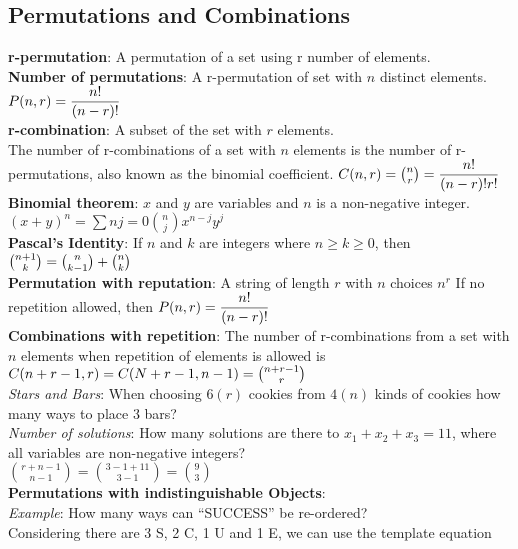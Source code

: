 \documentclass[letter]{article}
\begin{document}
\begin{multicols}{2}
  \subsection{Permutations and Combinations} 
  \textbf{r-permutation}: A permutation of a set using r number of
  elements. \\
  \textbf{Number of permutations}: A r-permutation of set with $n$ distinct
  elements.
  $\\P(n, r) = \dfrac{n!}{(n - r)!}$\\
  \textbf{r-combination}: A subset of the set with $r$ elements. \\
  The number of r-combinations of a set with $n$ elements is the number of
  r-permutations, also known as the binomial coefficient.
  $\\C(n, r) = \binom{n}{r} = \dfrac{n!}{(n - r)!r!}$\\
  \textbf{Binomial theorem}: $x$ and $y$ are variables and $n$ is a
  non-negative integer. \\
  ${(x + y)}^{n} = \sum{n}{j = 0}\binom{n}{j}x^{n - j}y^{j}$\\
  \textbf{Pascal's Identity}: If $n$ and $k$ are integers where
  $n \geq k \geq 0$, then
  $\\\binom{n + 1}{k}=\binom{n}{k - 1}+\binom{n}{k}$\\
  \textbf{Permutation with reputation}: A string of length $r$ with $n$
  choices $n^r$ If no repetition allowed, then
  $\\P(n, r) = \dfrac{n!}{(n - r)!}$\\
  \textbf{Combinations with repetition}: The number of r-combinations from a
  set with $n$ elements when repetition of elements is allowed is
  $\\C(n + r - 1, r)=C(N + r - 1, n - 1) = \binom{n + r - 1}{r}$\\
  \textit{Stars and Bars}: When choosing $6(r)$ cookies from $4(n)$ kinds of
  cookies how many ways to place 3 bars? \\
  \textit{Number of solutions}: How many solutions are there to
  $x_1 + x_2 + x_3 = 11$, where all variables are non-negative integers? \\
  $\binom{r + n - 1}{n - 1} = \binom{3 - 1 + 11}{3 - 1} = \binom{9}{3}$\\
  \textbf{Permutations with indistinguishable Objects}: \\
  \textit{Example}: How many ways can ``SUCCESS'' be re-ordered? \\
  Considering there are 3 S, 2 C, 1 U and 1 E, we can use the template equation

\end{multicols}
\end{document}
